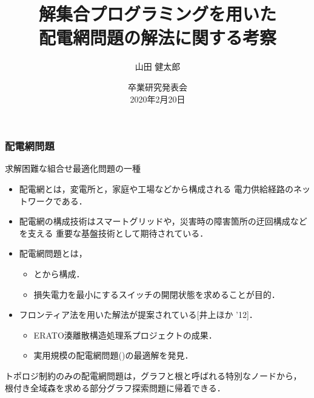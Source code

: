 \documentclass[dvipdfmx,11pt]{beamer}
\title{解集合プログラミングを用いた\\配電網問題の解法に関する考察}
\author{山田 健太郎}
\date{卒業研究発表会\\2020年2月20日}
\institute{番原研究室}
\begin{document}
\begin{frame}\frametitle{}
  \titlepage
\end{frame}

\begin{frame}\frametitle{配電網問題}
 \begin{alertblock}{}
  \centering
  求解困難な組合せ最適化問題の一種
 \end{alertblock}

 \begin{itemize}
  \item  \alert{配電網}とは，変電所と，家庭や工場などから構成される
		 電力供給経路のネットワークである．
  \item  配電網の構成技術はスマートグリッドや，災害時の障害箇所の迂回構成などを支える
		 重要な基盤技術として期待されている．
  \item  \alert{配電網問題}とは，
		 \begin{itemize}
		  \item {}とから構成．
		  \item 損失電力を最小にするスイッチの開閉状態を求めることが目的．
		 \end{itemize}
  \item フロンティア法を用いた解法が提案されている[井上ほか '12]． 
		\begin{itemize}
		 \item ERATO湊離散構造処理系プロジェクトの成果．
		 \item 実用規模の配電網問題()の最適解を発見．
		\end{itemize}
 \end{itemize}

 \vspace{-0.25cm}
 \pause
 \begin{alertblock}{}
  トポロジ制約のみの配電網問題は，グラフと根と呼ばれる特別なノードから，
  \alert{根付き全域森}を求める部分グラフ探索問題に帰着できる．
 \end{alertblock}
  
\end{frame}
\end{document}
